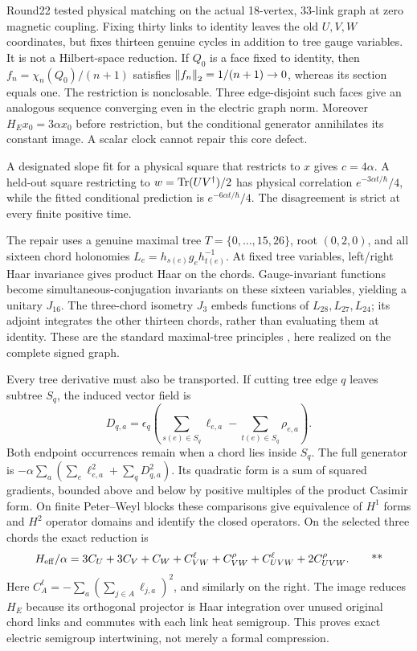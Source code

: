 Round22 tested physical matching on the actual 18-vertex, 33-link graph
at zero magnetic coupling. Fixing thirty links to identity leaves the
old \(U,V,W\) coordinates, but fixes thirteen genuine cycles in addition
to tree gauge variables. It is not a Hilbert-space reduction.
If \(Q_0\) is a face fixed to identity, then
\(f_n=\chi_n(Q_0)/(n+1)\) satisfies
\(\left\lVert f_n\right\rVert_2=1/(n+1)\to0\), whereas its section equals one.
The restriction is nonclosable. Three edge-disjoint such faces give an
analogous sequence converging even in the electric graph norm.
Moreover \(H_E x_0=3\alpha x_0\) before restriction, but the conditional
generator annihilates its constant image. A scalar clock cannot repair
this core defect.

A designated slope fit for a physical square that restricts to \(x\)
gives \(c=4\alpha\). A held-out square restricting to
\(w=\operatorname{Tr}(UV^\dagger)/2\) has physical correlation
\(e^{-3\alpha t/\hbar}/4\), while the fitted conditional prediction is
\(e^{-6\alpha t/\hbar}/4\). The disagreement is strict at every
finite positive time.

The repair uses a genuine maximal tree
\(T=\{0,\ldots,15,26\}\), root \((0,2,0)\), and all sixteen chord
holonomies \(L_e=h_{s(e)}g_eh_{t(e)}^{-1}\).
At fixed tree variables, left/right Haar invariance gives product Haar
on the chords. Gauge-invariant functions become simultaneous-conjugation
invariants on these sixteen variables, yielding a unitary \(J_{16}\).
The three-chord isometry \(J_3\) embeds functions of \(L_{28},L_{27},L_{24}\);
its adjoint integrates the other thirteen chords, rather than evaluating
them at identity. These are the standard maximal-tree principles
\cite{burbano2024gauge}, here realized on the complete signed graph.

Every tree derivative must also be transported. If cutting tree edge \(q\)
leaves subtree \(S_q\), the induced vector field is
\[
 D_{q,a}=\epsilon_q\left(
 \sum_{s(e)\in S_q}\ell_{e,a}
 -\sum_{t(e)\in S_q}\rho_{e,a}\right).
\]
Both endpoint occurrences remain when a chord lies inside \(S_q\).
The full generator is
\(-\alpha\sum_a(\sum_e\ell_{e,a}^2+\sum_qD_{q,a}^2)\).
Its quadratic form is a sum of squared gradients, bounded above and below
by positive multiples of the product Casimir form. On finite
Peter--Weyl blocks these comparisons give equivalence of \(H^1\) forms
and \(H^2\) operator domains and identify the closed operators.
On the selected three chords the exact reduction is
\begin{equation}
 H_{\rm eff}/\alpha=
 3C_U+3C_V+C_W+C^\ell_{VW}+C^\rho_{VW}
                  +C^\ell_{UVW}+2C^\rho_{UVW}.
 \qquad\text{**}
 \label{eq:middle-effective}
\end{equation}
Here \(C^\ell_A=-\sum_a(\sum_{j\in A}\ell_{j,a})^2\), and similarly
on the right. The image reduces \(H_E\) because its orthogonal projector
is Haar integration over unused original chord links and commutes with
each link heat semigroup. This proves exact electric semigroup
intertwining, not merely a formal compression.

